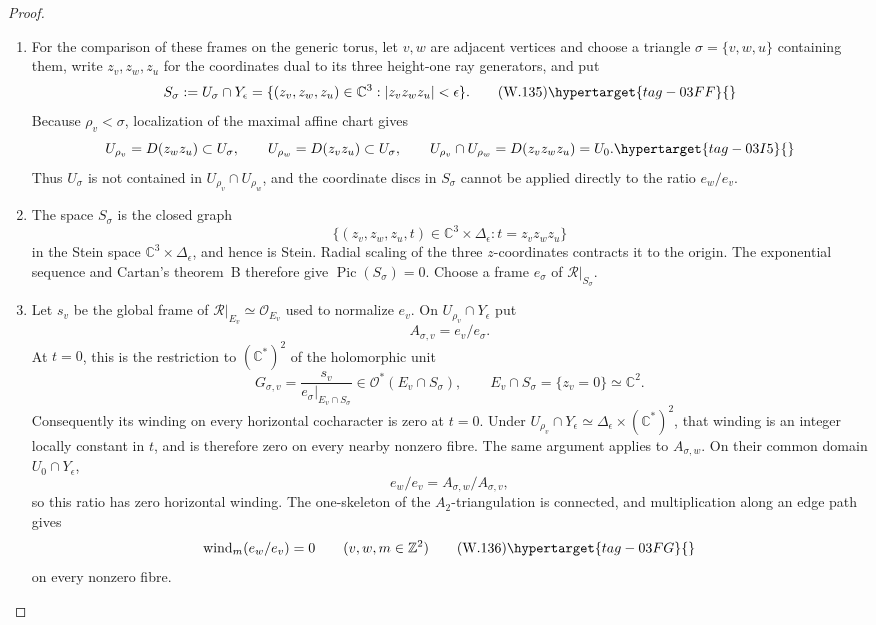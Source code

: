 \begin{proof}
\begin{enumerate}[label=\arabic*.,leftmargin=*]
\item For the comparison of these frames on the generic torus, let \(v,w\) are
adjacent vertices and choose a triangle \(\sigma=\{v,w,u\}\) containing them,
write \(z_v,z_w,z_u\) for the coordinates dual to its three height-one ray
generators, and put
\[
 S_\sigma:=U_\sigma\cap Y_\epsilon
 =\{(z_v,z_w,z_u)\in\mathbb C^3:
       |z_vz_wz_u|<\epsilon\}.
\tag{W.135}\hypertarget{tag-03FF}{}\label{wbII:eq:W:5.17-A34a}
\]
Because \(\rho_v<\sigma\), localization of the maximal affine chart gives
\begin{equation}
 U_{\rho_v}=D(z_wz_u)\subset U_\sigma,\qquad
 U_{\rho_w}=D(z_vz_u)\subset U_\sigma,\qquad
 U_{\rho_v}\cap U_{\rho_w}=D(z_vz_wz_u)=U_0.
\hypertarget{tag-03I5}{}\label{wbII:eq:analytic-toric-open-directions}
\end{equation}
Thus \(U_\sigma\) is not contained in \(U_{\rho_v}\cap U_{\rho_w}\), and
the coordinate discs in \(S_\sigma\) cannot be applied directly to the
ratio \(e_w/e_v\).

\item The space $S_\sigma$ is the closed graph
\[
 \{(z_v,z_w,z_u,t)\in\mathbb C^3\times\Delta_\epsilon:
   t=z_vz_wz_u\}
\]
in the Stein space \(\mathbb C^3\times\Delta_\epsilon\), and hence is
Stein.  Radial scaling of the three \(z\)-coordinates contracts it to the
origin.  The exponential sequence and Cartan's theorem~B therefore give
\(\operatorname{Pic}(S_\sigma)=0\).  Choose a frame \(e_\sigma\) of
\(\mathcal R|_{S_\sigma}\).

\item Let \(s_v\) be the global frame of
\(\mathcal R|_{E_v}\simeq\mathcal O_{E_v}\) used to normalize \(e_v\).
On \(U_{\rho_v}\cap Y_\epsilon\) put
\[
 A_{\sigma,v}=e_v/e_\sigma.
\]
At \(t=0\), this is the restriction to \((\mathbb C^*)^2\) of the
holomorphic unit
\[
 G_{\sigma,v}
 =\frac{s_v}{e_\sigma|_{E_v\cap S_\sigma}}
 \in\mathcal O^*(E_v\cap S_\sigma),
 \qquad E_v\cap S_\sigma=\{z_v=0\}\simeq\mathbb C^2.
\]
Consequently its winding on every horizontal cocharacter is zero at
\(t=0\).  Under
\(U_{\rho_v}\cap Y_\epsilon\simeq
\Delta_\epsilon\times(\mathbb C^*)^2\), that winding is an integer locally
constant in \(t\), and is therefore zero on every nearby nonzero fibre.
The same argument applies to \(A_{\sigma,w}\).  On their common
domain \(U_0\cap Y_\epsilon\),
\[
 e_w/e_v=A_{\sigma,w}/A_{\sigma,v},
\]
so this ratio has zero horizontal winding.  The one-skeleton of the
\(A_2\)-triangulation is connected, and multiplication along an edge path
gives
\[
 \operatorname{wind}_m(e_w/e_v)=0
 \qquad(v,w,m\in\mathbb Z^2)
\tag{W.136}\hypertarget{tag-03FG}{}\label{wbII:eq:W:5.17-A34b}
\]
on every nonzero fibre.


\end{enumerate}
\end{proof}
